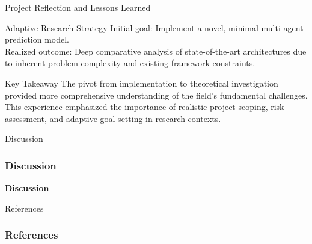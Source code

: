\documentclass[10pt,aspectratio=169]{beamer}
\begin{document}
\begin{frame}{Project Reflection and Lessons Learned}
    \begin{block}{Adaptive Research Strategy}
        Initial goal: Implement a novel, minimal multi-agent prediction model. \\
        Realized outcome: Deep comparative analysis of state-of-the-art architectures due to inherent problem complexity and existing framework constraints.
    \end{block}

    \begin{alertblock}{Key Takeaway}
        The pivot from implementation to theoretical investigation provided more comprehensive understanding of the field's fundamental challenges. This experience emphasized the importance of realistic project scoping, risk assessment, and adaptive goal setting in research contexts.
    \end{alertblock}
\end{frame}

\begin{frame}{Discussion}
    \frametitle{Discussion}
    \begin{center}
        {\LARGE\bfseries Discussion}
    \end{center}
\end{frame}

\begin{frame}[allowframebreaks]{References}
  \frametitle{References}
  
  
\end{frame}
\end{document}
